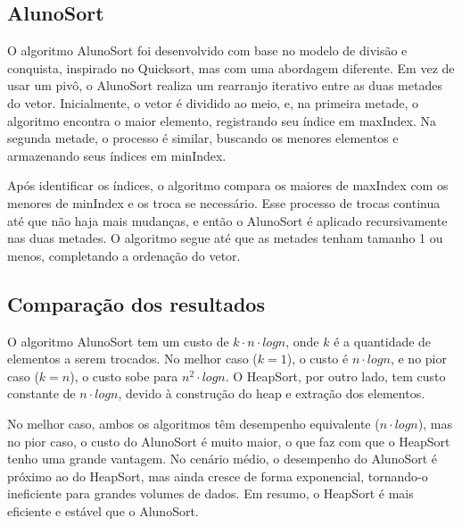 \documentclass{SBCbookchapter}
\begin{document}
\subsection{AlunoSort}
O algoritmo AlunoSort foi desenvolvido com base no modelo de divisão e conquista, inspirado no Quicksort, mas com uma abordagem diferente. Em vez de usar um pivô, o AlunoSort realiza um rearranjo iterativo entre as duas metades do vetor. Inicialmente, o vetor é dividido ao meio, e, na primeira metade, o algoritmo encontra o maior elemento, registrando seu índice em maxIndex. Na segunda metade, o processo é similar, buscando os menores elementos e armazenando seus índices em minIndex.

Após identificar os índices, o algoritmo compara os maiores de maxIndex com os menores de minIndex e os troca se necessário. Esse processo de trocas continua até que não haja mais mudanças, e então o AlunoSort é aplicado recursivamente nas duas metades. O algoritmo segue até que as metades tenham tamanho 1 ou menos, completando a ordenação do vetor.

\subsection{Comparação dos resultados}
    
O algoritmo AlunoSort tem um custo de $k \cdot n \cdot log n$, onde $k$ é a quantidade de elementos a serem trocados. No melhor caso ($k = 1$), o custo é $n \cdot log n$, e no pior caso ($k = n$), o custo sobe para $n^2 \cdot log n$. O HeapSort, por outro lado, tem custo constante de $n \cdot log n$, devido à construção do heap e extração dos elementos.

No melhor caso, ambos os algoritmos têm desempenho equivalente ($n \cdot log n$), mas no pior caso, o custo do AlunoSort é muito maior, o que faz com que o HeapSort tenho uma grande vantagem. No cenário médio, o desempenho do AlunoSort é próximo ao do HeapSort, mas ainda cresce de forma exponencial, tornando-o ineficiente para grandes volumes de dados. Em resumo, o HeapSort é mais eficiente e estável que o AlunoSort.
\end{document}
